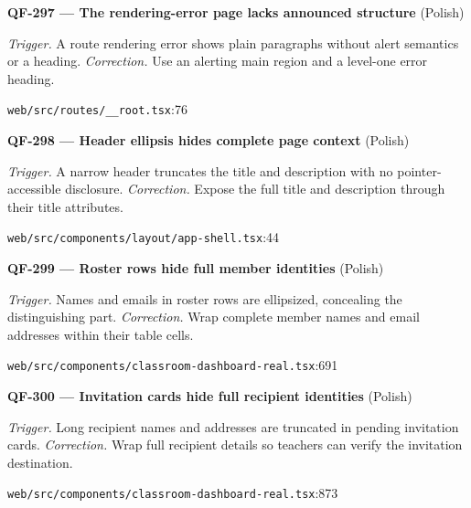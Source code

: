 \begin{minipage}{\linewidth}
\textbf{QF-297 --- The rendering-error page lacks announced structure} {\scriptsize\color{accent}(Polish)}\par
\textit{Trigger.} A route rendering error shows plain paragraphs without alert semantics or a heading. \textit{Correction.} Use an alerting main region and a level-one error heading.\par
{\scriptsize\color{muted}\nolinkurl{web/src/routes/__root.tsx}:76}\par
\end{minipage}\par\vspace{7pt}
\begin{minipage}{\linewidth}
\textbf{QF-298 --- Header ellipsis hides complete page context} {\scriptsize\color{accent}(Polish)}\par
\textit{Trigger.} A narrow header truncates the title and description with no pointer-accessible disclosure. \textit{Correction.} Expose the full title and description through their title attributes.\par
{\scriptsize\color{muted}\nolinkurl{web/src/components/layout/app-shell.tsx}:44}\par
\end{minipage}\par\vspace{7pt}
\begin{minipage}{\linewidth}
\textbf{QF-299 --- Roster rows hide full member identities} {\scriptsize\color{accent}(Polish)}\par
\textit{Trigger.} Names and emails in roster rows are ellipsized, concealing the distinguishing part. \textit{Correction.} Wrap complete member names and email addresses within their table cells.\par
{\scriptsize\color{muted}\nolinkurl{web/src/components/classroom-dashboard-real.tsx}:691}\par
\end{minipage}\par\vspace{7pt}
\begin{minipage}{\linewidth}
\textbf{QF-300 --- Invitation cards hide full recipient identities} {\scriptsize\color{accent}(Polish)}\par
\textit{Trigger.} Long recipient names and addresses are truncated in pending invitation cards. \textit{Correction.} Wrap full recipient details so teachers can verify the invitation destination.\par
{\scriptsize\color{muted}\nolinkurl{web/src/components/classroom-dashboard-real.tsx}:873}\par
\end{minipage}\par\vspace{7pt}